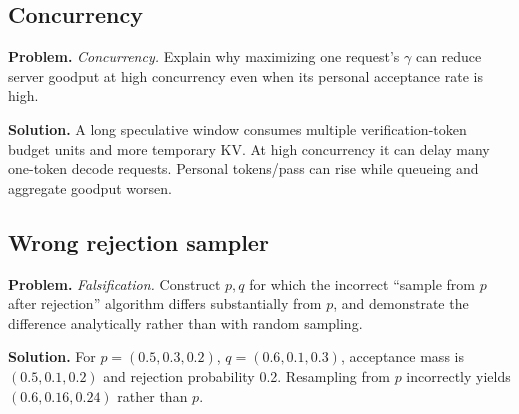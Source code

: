 \subsection{Concurrency}
\textbf{Problem.} \emph{Concurrency.} Explain why maximizing one request's $\gamma$ can reduce
server goodput at high concurrency even when its personal acceptance rate is high.

\textbf{Solution.} A long speculative window consumes multiple verification-token budget units and more
temporary KV. At high concurrency it can delay many one-token decode requests. Personal
tokens/pass can rise while queueing and aggregate goodput worsen.

\subsection{Wrong rejection sampler}
\textbf{Problem.} \emph{Falsification.} Construct $p,q$ for which the incorrect ``sample from
$p$ after rejection'' algorithm differs substantially from $p$, and demonstrate the
difference analytically rather than with random sampling.

\textbf{Solution.} For $p=(0.5,0.3,0.2)$, $q=(0.6,0.1,0.3)$, acceptance mass is
$(0.5,0.1,0.2)$ and rejection probability 0.2. Resampling from $p$ incorrectly yields
$(0.6,0.16,0.24)$ rather than $p$.
